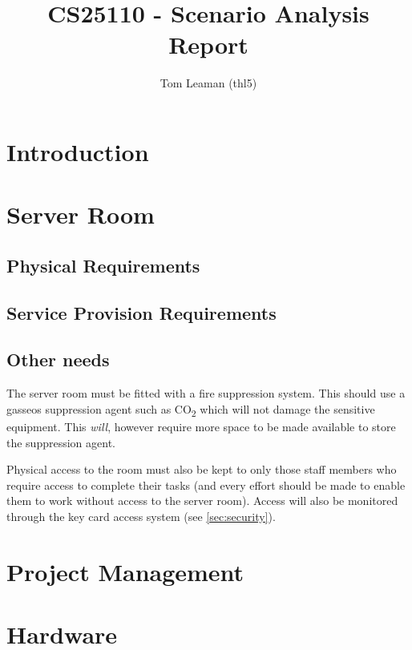 \documentclass[a4paper, twoside]{article}
\title{CS25110 - Scenario Analysis Report}
\author{Tom Leaman (thl5)}
\begin{document}
\maketitle
\newpage

\section{Introduction}

\section{Server Room}
\subsection{Physical Requirements}

\subsection{Service Provision Requirements}

\subsection{Other needs}
The server room must be fitted with a fire suppression system. This should use a
gasseos suppression agent such as CO\textsubscript{2} which will not damage the
sensitive equipment. This \emph{will}, however require more space to be made
available to store the suppression agent.

Physical access to the room must also be kept to only those staff members who
require access to complete their tasks (and every effort should be made to
enable them to work without access to the server room). Access will also be
monitored through the key card access system (see \ref{sec:security}).

\section{Project Management}

\section{Hardware}
\end{document}
